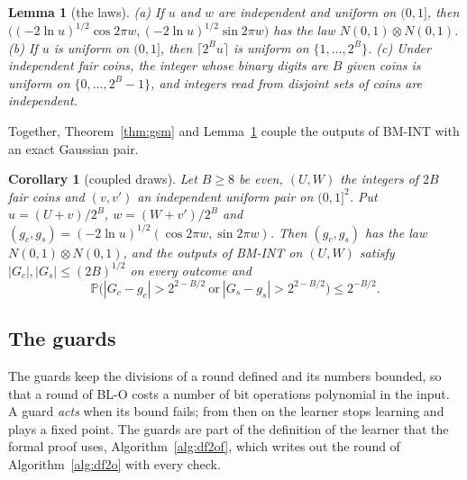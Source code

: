 \documentclass[11pt]{amsart}
\newtheorem{lemma}[theorem]{Lemma}
\newtheorem{corollary}[theorem]{Corollary}
\theoremstyle{definition}
\numberwithin{equation}{section}
\newcommand{\Prob}{\mathbb{P}}
\begin{document}
\begin{lemma}[the laws]\label{lem:bmlaw}
(a) If $u$ and $w$ are independent and uniform on $(0,1]$, then $\bigl((-2\ln u)^{1/2}\cos2\pi w,(-2\ln u)^{1/2}\sin2\pi w\bigr)$ has the law $N(0,1)\otimes N(0,1)$. (b) If $u$ is uniform on $(0,1]$, then $\lceil2^Bu\rceil$ is uniform on $\{1,\dots,2^B\}$. (c) Under independent fair coins, the integer whose binary digits are $B$ given coins is uniform on $\{0,\dots,2^B-1\}$, and integers read from disjoint sets of coins are independent.
\end{lemma}

Together, Theorem~\ref{thm:gsm} and Lemma~\ref{lem:bmlaw} couple the outputs of BM-INT with an exact Gaussian pair.

\begin{corollary}[coupled draws]\label{cor:gs}
Let $B\ge8$ be even, $(U,W)$ the integers of $2B$ fair coins and $(v,v')$ an independent uniform pair on $(0,1]^2$. Put $u=(U+v)/2^B$, $w=(W+v')/2^B$ and $(g_c,g_s)=(-2\ln u)^{1/2}(\cos2\pi w,\sin2\pi w)$. Then $(g_c,g_s)$ has the law $N(0,1)\otimes N(0,1)$, and the outputs of BM-INT on $(U,W)$ satisfy $|G_c|,|G_s|\le(2B)^{1/2}$ on every outcome and
\[
\Prob\bigl(|G_c-g_c|>2^{2-B/2}\ \text{or}\ |G_s-g_s|>2^{2-B/2}\bigr)\le2^{-B/2}.
\]
\end{corollary}

\subsection{The guards}\label{sec:bit-guard}

The guards keep the divisions of a round defined and its numbers bounded, so that a round of BL-O costs a number of bit operations polynomial in the input. A guard \emph{acts} when its bound fails; from then on the learner stops learning and plays a fixed point. The guards are part of the definition of the learner that the formal proof uses, Algorithm~\ref{alg:df2of}, which writes out the round of Algorithm~\ref{alg:df2o} with every check.
\end{document}
